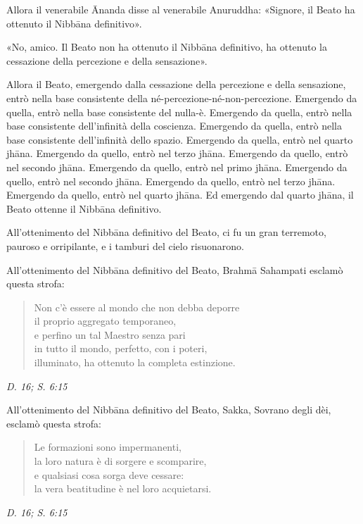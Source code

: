 Allora il venerabile Ānanda disse al venerabile Anuruddha: «Signore, il
Beato ha ottenuto il Nibbāna definitivo».


«No, amico. Il Beato non ha ottenuto il Nibbāna definitivo, ha ottenuto
la cessazione della percezione e della sensazione».


Allora il Beato, emergendo dalla cessazione della percezione e della
sensazione, entrò nella base consistente della
né-percezione-né-non-percezione. Emergendo da quella, entrò nella base
consistente del nulla-è. Emergendo da quella, entrò nella base
consistente dell’infinità della coscienza. Emergendo da quella, entrò
nella base consistente dell’infinità dello spazio. Emergendo da quella,
entrò nel quarto jhāna. Emergendo da quello, entrò nel terzo jhāna.
Emergendo da quello, entrò nel secondo jhāna. Emergendo da quello, entrò
nel primo jhāna. Emergendo da quello, entrò nel secondo jhāna. Emergendo
da quello, entrò nel terzo jhāna. Emergendo da quello, entrò nel quarto
jhāna. Ed emergendo dal quarto jhāna, il Beato ottenne il Nibbāna
definitivo.


All’ottenimento del Nibbāna definitivo del Beato, ci fu un gran
terremoto, pauroso e orripilante, e i tamburi del cielo risuonarono.


All’ottenimento del Nibbāna definitivo del Beato, Brahmā Sahampati
esclamò questa strofa:


\begin{quote}
Non c’è essere al mondo che non debba deporre \\
il proprio aggregato temporaneo, \\
e perfino un tal Maestro senza pari \\
in tutto il mondo, perfetto, con i poteri, \\
illuminato, ha ottenuto la completa estinzione.
\end{quote}

\emph{D. 16; S. 6:15}


All’ottenimento del Nibbāna definitivo del Beato, Sakka, Sovrano degli
dèi, esclamò questa strofa:


\begin{quote}
Le formazioni sono impermanenti, \\
la loro natura è di sorgere e scomparire, \\
e qualsiasi cosa sorga deve cessare: \\
la vera beatitudine è nel loro acquietarsi.
\end{quote}

\emph{D. 16; S. 6:15}


